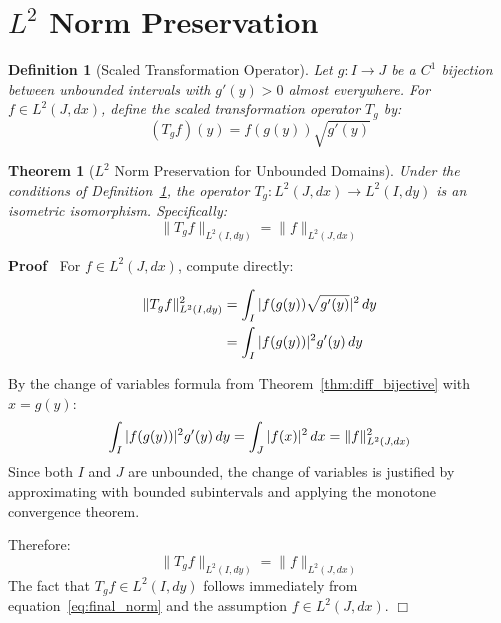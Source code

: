 \documentclass{article}
\newenvironment{proof}{\noindent\textbf{Proof\ }}{\hspace*{\fill}$\Box$\medskip}
\newtheorem{definition}{Definition}
\newtheorem{theorem}{Theorem}
\begin{document}
\section{$L^2$ Norm Preservation}

\begin{definition}[Scaled Transformation Operator]
  \label{def:scaled_transform}Let $g : I \to J$ be a $C^1$ bijection between
  unbounded intervals with $g' (y) > 0$ almost everywhere. For $f \in L^2 (J,
  dx)$, define the scaled transformation operator $T_g$ by:
  \begin{equation}
    \label{eq:scaled_transform} (T_g f) (y) = f (g (y)) \sqrt{g' (y)}
  \end{equation}
\end{definition}

\begin{theorem}[$L^2$ Norm Preservation for Unbounded Domains]
  \label{thm:l2_preservation}Under the conditions of
  Definition~\ref{def:scaled_transform}, the operator $T_g : L^2 (J, dx) \to
  L^2 (I, dy)$ is an isometric isomorphism. Specifically:
  \begin{equation}
    \label{eq:norm_equality} \|T_g f\|_{L^2 (I, dy)} = \|f\|_{L^2 (J, dx)}
  \end{equation}
\end{theorem}

\begin{proof}
  For $f \in L^2 (J, dx)$, compute directly:
  
  \begin{align}
    \|T_g f\|_{L^2 (I, dy)}^2 & = \int_I |f (g (y)) \sqrt{g' (y)} |^2 
    \hspace{0.17em} dy  \label{eq:norm_calc1}\\
    & = \int_I |f (g (y)) |^2 g' (y)  \hspace{0.17em} dy 
    \label{eq:norm_calc2}
  \end{align}
  
  By the change of variables formula from Theorem~\ref{thm:diff_bijective}
  with $x = g (y)$:
  \begin{equation}
    \label{eq:change_vars_apply} \int_I |f (g (y)) |^2 g' (y) \hspace{0.17em}
    dy = \int_J |f (x) |^2  \hspace{0.17em} dx = \|f\|_{L^2 (J, dx)}^2
  \end{equation}
  Since both $I$ and $J$ are unbounded, the change of variables is justified
  by approximating with bounded subintervals and applying the monotone
  convergence theorem.
  
  Therefore:
  \begin{equation}
    \label{eq:final_norm} \|T_g f\|_{L^2 (I, dy)} = \|f\|_{L^2 (J, dx)}
  \end{equation}
  The fact that $T_g f \in L^2 (I, dy)$ follows immediately from
  equation~\eqref{eq:final_norm} and the assumption $f \in L^2 (J, dx)$.
\end{proof}
\end{document}
